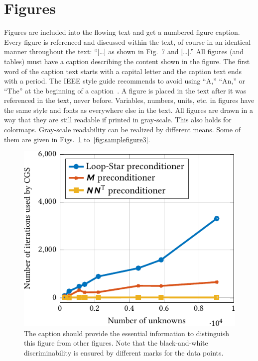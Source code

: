 \section{Figures}    %
Figures are included into the flowing text and get a numbered figure caption. 
Every figure is referenced and discussed within the text, of course in an identical manner throughout the text: ``[\dots] as
shown in Fig.~7 and [\dots].''
All figures (and tables) must have a caption describing the content shown in the figure.
The first word of the caption text starts with a capital letter and the caption text ends with a period.
The IEEE style guide recommends to avoid using ``A,'' ``An,'' or ``The'' at the beginning of a caption~\cite{IEEEStyle}.   
A figure is placed in the text after it was referenced in the text, never before.
Variables, numbers, units, etc. in figures have the same style and fonts as everywhere else in the text. 
All figures are drawn in a way that they are still readable if printed in gray-scale. 
This also holds for colormaps.
Gray-scale readability can be realized by different means. 
Some of them are given in Figs.~\ref{fig:samplefigure} to~\ref{fig:samplefigure3}. %
\begin{figure}[tp]
    \centering
    \includegraphics{./Figures/Fig_1__Results/Fig_1__Results.pdf}
    \caption{The caption should provide the essential information to distinguish this figure from other figures. 
        Note that the black-and-white discriminability is ensured by different marks for the data points.}
    \label{fig:samplefigure}
\end{figure}%

